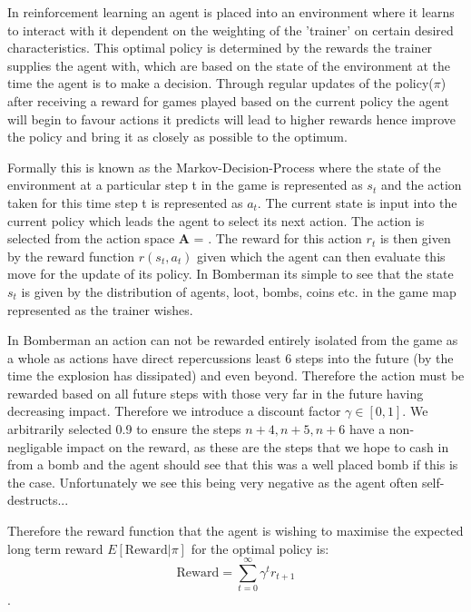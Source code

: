 In reinforcement learning an agent is placed into an environment where it learns to interact with it dependent on the weighting of the 'trainer' on certain desired characteristics. This optimal policy is determined by the rewards the trainer supplies the agent with, which are based on the state of the environment at the time the agent is to make a decision. Through regular updates of the policy($\pi$) after receiving a reward for games played based on the current policy the agent will begin to favour actions it predicts will lead to higher rewards hence improve the policy and bring it as closely as possible to the optimum.

Formally this is known as the Markov-Decision-Process where the state of the environment at a particular step t in the game is represented as \(s_t\) and the action taken for this time step t is represented as $a_t$. The current state is input into the current policy which leads the agent to select its next action. The action is selected from the action space \textbf{A} = . The reward for this action $r_t$ is then given by the reward function $r(s_t, a_t)$ given which the agent can then evaluate this move for the update of its policy. In Bomberman its simple to see that the state $s_t$ is given by the distribution of agents, loot, bombs, coins etc. in the game map represented as the trainer wishes. 

In Bomberman an action can not be rewarded entirely isolated from the game as a whole as actions have direct repercussions least 6 steps into the future (by the time the explosion has dissipated) and even beyond. Therefore the action must be rewarded based on all future steps with those very far in the future having decreasing impact. Therefore we introduce a discount factor $\gamma \in [0, 1]$. We arbitrarily selected 0.9 to ensure the steps $n+4, n+5, n+6$ have a non-negligable impact on the reward, as these are the steps that we hope to cash in from a bomb and the agent should see that this was a well placed bomb if this is the case. Unfortunately we see this being very negative as the agent often self-destructs...

Therefore the reward function that the agent is wishing to maximise the expected long term reward $E[\text{Reward}|\pi]$ for the optimal policy is: $$\text{Reward} = \sum_{t=0}^{\infty} \gamma^t r_{t+1}$$. 

